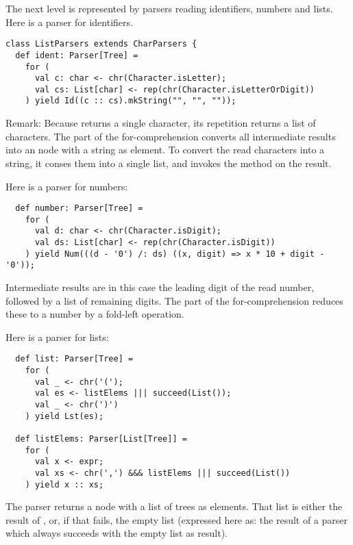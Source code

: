 {The next level is represented by parsers reading identifiers, numbers
and lists. Here is a parser for identifiers.
\begin{lstlisting}
class ListParsers extends CharParsers {
  def ident: Parser[Tree] = 
    for (
      val c: char <- chr(Character.isLetter); 
      val cs: List[char] <- rep(chr(Character.isLetterOrDigit))
    ) yield Id((c :: cs).mkString("", "", ""));
\end{lstlisting}
Remark: Because  returns a single character, its
repetition  returns a list of characters. The
 part of the for-comprehension converts all intermediate
results into an  node with a string as element.  To convert
the read characters into a string, it conses them into a single list,
and invokes the  method on the result.

Here is a parser for numbers:
\begin{lstlisting}
  def number: Parser[Tree] =
    for (
      val d: char <- chr(Character.isDigit);
      val ds: List[char] <- rep(chr(Character.isDigit))
    ) yield Num(((d - '0') /: ds) ((x, digit) => x * 10 + digit - '0'));
\end{lstlisting}
Intermediate results are in this case the leading digit of
the read number, followed by a list of remaining digits.  The
 part of the for-comprehension reduces these to a number
by a fold-left operation.

Here is a parser for lists:
\begin{lstlisting}
  def list: Parser[Tree] = 
    for (
      val _ <- chr('(');
      val es <- listElems ||| succeed(List());
      val _ <- chr(')')
    ) yield Lst(es);

  def listElems: Parser[List[Tree]] = 
    for (
      val x <- expr;
      val xs <- chr(',') &&& listElems ||| succeed(List())
    ) yield x :: xs;
\end{lstlisting}
The  parser returns a  node with a list of trees
as elements.  That list is either the result of , or,
if that fails, the empty list (expressed here as: the result of a
parser which always succeeds with the empty list as result).

}
